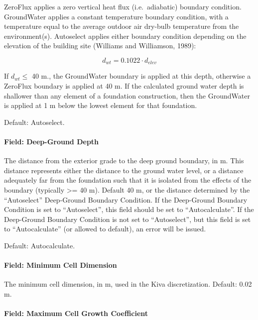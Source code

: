 ZeroFlux applies a zero vertical heat flux (i.e.~adiabatic) boundary
condition. GroundWater applies a constant temperature boundary
condition, with a temperature equal to the average outdoor air dry-bulb
temperature from the environment(s). Autoselect applies either boundary
condition depending on the elevation of the building site (Williams and
Williamson, 1989):

\[d_{wt}=0.1022\cdot d_{elev}\]

If \(d_{wt} \le\) 40 m., the GroundWater boundary is applied at this depth, otherwise
a ZeroFlux boundary is applied at 40 m. If the calculated ground water depth is
shallower than any element of a foundation construction, then the GroundWater
is applied at 1 m below the lowest element for that foundation.

Default: Autoselect.

\paragraph{Field: Deep-Ground Depth}\label{foundation-kiva-settings-deep-ground-depth}

The distance from the exterior grade to the deep ground boundary, in m.
This distance represents either the distance to the ground water level,
or a distance adequately far from the foundation such that it is
isolated from the effects of the boundary (typically \textgreater{}= 40
m). Default 40 m, or the distance determined by the ``Autoselect'' Deep-Ground
Boundary Condition. If the Deep-Ground Boundary Condition is set to ``Autoselect'', this field
should be set to ``Autocalculate''. If the Deep-Ground Boundary Condition is not set
to ``Autoselect'', but this field is set to ``Autocalculate'' (or allowed to default), an error
will be issued.

Default: Autocalculate.

\paragraph{Field: Minimum Cell Dimension}\label{foundation-kiva-settings-minimum-cell-dimension}

The minimum cell dimension, in m, used in the Kiva discretization.
Default: 0.02 m.

\paragraph{Field: Maximum Cell Growth Coefficient}\label{foundation-kiva-settings-maximum-cell-growth-coefficient}

